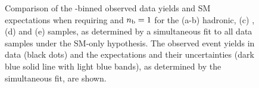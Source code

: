 \begin{figure}[t!]
\begin{center}
{    } 
    \caption{\label{fig:best-fit-le3j1b} Comparison of the
      \scalht-binned observed data yields and SM expectations when
      requiring \njetlow and $n_{\text{b}} = 1$ for the (a-b) hadronic, (c)
      \mj, (d) \mmj and (e) \gj samples, as determined by a
      simultaneous fit to all data samples under the SM-only
      hypothesis. The observed event yields in data (black dots) and
      the expectations and their uncertainties (dark blue solid line
      with light blue bands), as determined by the simultaneous fit,
      are shown. %
      }
  \end{center}
\end{figure}


